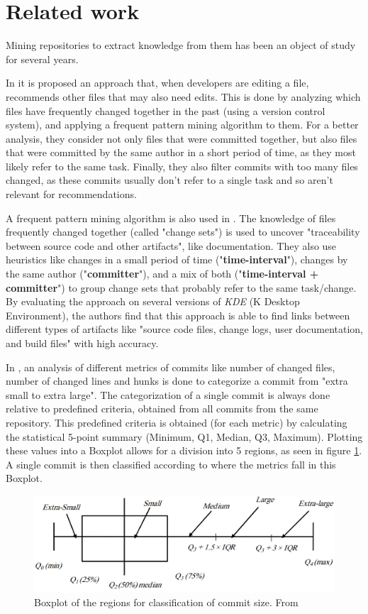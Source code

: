 \section{Related work}
Mining repositories to extract knowledge from them has been an object of study for several years.

In \cite{Ying_2004} it is proposed an approach that, when developers are editing a file, recommends other files that may also need edits. This is done by analyzing which files have frequently changed together in the past (using a version control system), and applying a frequent pattern mining algorithm to them. For a better analysis, they consider not only files that were committed together, but also files that were committed by the same author in a short period of time, as they most likely refer to the same task. Finally, they also filter commits with too many files changed, as these commits usually don't refer to a single task and so aren't relevant for recommendations.

A frequent pattern mining algorithm is also used in \cite{Kagdi_2007}. The knowledge of files frequently changed together (called "change sets") is used to uncover "traceability between source code and other artifacts", like documentation. They also use heuristics like changes in a small period of time ("\textbf{time-interval}"), changes by the same author ("\textbf{committer}"), and a mix of both ("\textbf{time-interval + committer}") to group change sets that probably refer to the same task/change. By evaluating the approach on several versions of \textit{KDE} (K Desktop Environment), the authors find that this approach is able to find links between different types of artifacts like "source code files, change logs, user documentation, and build files" with high accuracy.

In \cite{Alali_2008}, an analysis of different metrics of commits like number of changed files, number of changed lines and hunks is done to categorize a commit from "extra small to extra large". The categorization of a single commit is always done relative to predefined criteria, obtained from all commits from the same repository. This predefined criteria is obtained (for each metric) by calculating the statistical 5-point summary (Minimum, Q1, Median, Q3, Maximum). Plotting these values into a Boxplot allows for a division into 5 regions, as seen in figure \ref{fig:boxplot-commit-size}. A single commit is then classified according to where the metrics fall in this Boxplot.

\begin{figure}[h]
    \centering
    \includegraphics[scale=0.2]{imgs/boxplot-commit-size.png}
    \caption{Boxplot of the regions for classification of commit size. From \cite{Alali_2008}}
    \label{fig:boxplot-commit-size}
\end{figure}

